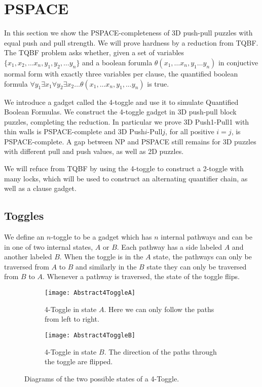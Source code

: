 \section{PSPACE}
\label{3DPSPACE}
In this section we show the PSPACE-completeness of 3D push-pull puzzles with equal push and pull strength. We will prove hardness by a reduction from TQBF. The TQBF problem asks whether, given a set of variables $\{x_1, x_2, \ldots x_n, y_1, y_2, \ldots y_n\}$ and a boolean forumla $\theta(x_1, \ldots x_n, y_1 \ldots y_n)$ in conjuctive normal form with exactly three variables per clause, the quantified boolean formula $\forall y_1 \exists x_1 \forall y_2 \exists x_2 \ldots \theta(x_1, \ldots x_n, y_1, \ldots y_n)$ is true.

We introduce a gadget called the 4-toggle and use it to simulate Quantified Boolean Formulas\cite{NPBook}. We construct the 4-toggle gadget in 3D push-pull block puzzles, completing the reduction. In particular we prove 3D Push1-Pull1 with thin walls is PSPACE-complete and 3D Push$i$-Pull$j$, for all positive $i=j$, is PSPACE-complete. A gap between NP and PSPACE still remains for 3D puzzles with different pull and push values, as well as 2D puzzles. 

We will refuce from TQBF by using the 4-toggle to construct a 2-toggle with many locks, which will be used to construct an alternating quantifier chain, as well as a clause gadget.

\subsection{Toggles}
We define an $n$-toggle to be a gadget which has $n$ internal pathways and can be in one of two internal states, $A$ or $B$. Each pathway has a side labeled $A$ and another labeled $B$. When the toggle is in the $A$ state, the pathways can only be traversed from $A$ to $B$ and similarly in the $B$ state they can only be traversed from $B$ to $A$. Whenever a pathway is traversed, the state of the toggle flips.

\begin{figure}[!ht]
\centering
\begin{subfigure}[t]{0.45\textwidth}
  \centering
    \texttt{[image: Abstract4ToggleA]}
    \caption{4-Toggle in state $A$. Here we can only follow the paths from left to right.}
    \label{fig:Abstract4ToggleA}
\end{subfigure}
\begin{subfigure}[t]{0.45\textwidth}
  \centering
    \texttt{[image: Abstract4ToggleB]}
    \caption{4-Toggle in state $B$. The direction of the paths through the toggle are flipped.}
    \label{fig:Abstract4ToggleB}
\end{subfigure}
\caption{Diagrams of the two possible states of a 4-Toggle.}
\end{figure}

